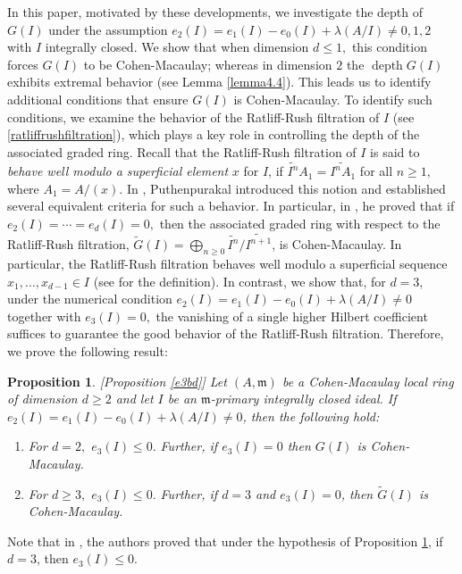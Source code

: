 \documentclass[11pt]{amsart}
\theoremstyle{plain}
\newtheorem{proposition}[theorem]{Proposition}
\newcommand{\m}{\mathfrak{m}}
\newcommand{\wt}{\widetilde}
\newcommand{\depth}{\operatorname{depth}}
\theoremstyle{plain}
\begin{document}
 In this paper,  motivated by these developments, we investigate the depth of $G(I)$ under the assumption $e_{2}(I)=e_{1}(I)-e_{0}(I)+\lambda(A/I) \neq 0,1,2$ with $I$ integrally closed.  We show that when dimension $d \leq 1,$ this condition forces  $G(I)$ to be Cohen-Macaulay; whereas in dimension $2$ the $\depth G(I)$ exhibits extremal behavior (see Lemma \ref{lemma4.4}). This leads us to identify additional conditions that ensure $G(I)$ is Cohen-Macaulay. 
To identify such conditions, we examine the behavior of the Ratliff-Rush filtration of $I$ (see \ref{ratliffrushfiltration}), which plays a key role in controlling the depth of the associated graded ring. Recall that the Ratliff-Rush filtration of $I$  %
is said to \textit{behave well modulo a superficial element} $x$ for $I$, if $\widetilde{I^{n}}A_{1}=\widetilde{I^{n}A_{1}}$ for all $n \geq 1,$ where $A_{1}=A/(x).$ In \cite{Part2}, Puthenpurakal introduced this notion and established several equivalent criteria for such a behavior. In particular,  in \cite[Theorem~6.2]{Part2}, he proved that if $e_2(I) = \cdots = e_d(I) = 0,$ then the associated graded ring with respect to the Ratliff-Rush filtration, $\widetilde{G}(I)=\displaystyle \bigoplus_{n \geq 0} \widetilde{I^{n}}/\widetilde{I^{n+1}}$, is Cohen-Macaulay. In particular, the Ratliff-Rush filtration behaves well modulo a superficial sequence $x_1, \ldots, x_{d-1} \in I$ (see \cite[Definition 4.4]{Part2} for the definition). In contrast, we show that, for $d=3$, under the numerical condition $e_{2}(I)=e_{1}(I)-e_{0}(I)+\lambda(A/I) \neq 0$ together with $e_{3}(I)=0,$ the vanishing of a single higher Hilbert coefficient suffices to guarantee the good behavior of the Ratliff-Rush filtration. Therefore, we prove the following result:


 \begin{proposition}
     
 [Proposition \ref{e3bd}] \label{e3cm}
 Let $(A,\m) $ be a Cohen-Macaulay local ring of dimension $d \geq 2$ and let $I$ be an $\m$-primary integrally closed ideal. If $e_2(I)=e_1(I)-e_0(I)+\lambda(A/I)\neq 0$, then the following hold:
\begin{enumerate} [\normalfont(i)]
     \item  For $d=2,$ $e_3(I)\leq 0.$ Further, if  $e_3(I)=0$ then $G(I)$ is Cohen-Macaulay.

    \item For $d\geq 3,$ $e_3(I)\leq 0.$ Further, if $d=3$ and $e_3(I)=0$, then $\wt{G}(I)$ is Cohen-Macaulay. 
\end{enumerate}
\end{proposition} 
Note that in \cite[Theorem 2.8]{mafi}, the authors proved that under the hypothesis of Proposition \ref{e3cm}, if $d=3$, then $e_3(I)\leq 0.$
\end{document}
